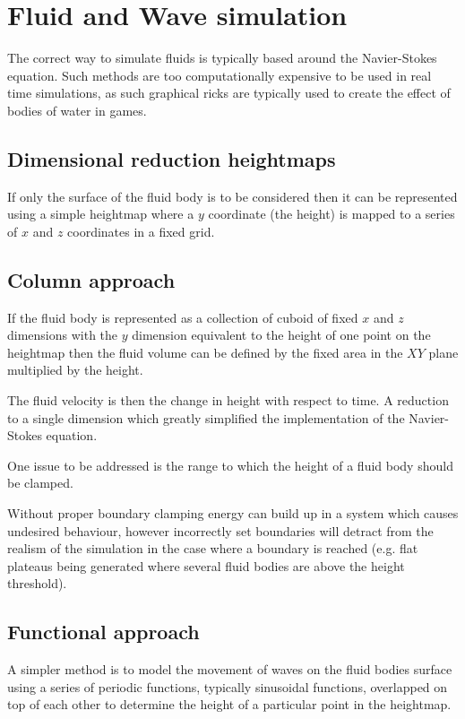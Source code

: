 \documentclass[a4paper]{article}
\begin{document}
\section{Fluid and Wave simulation}
\label{sec:fluid_dynamics}

The correct way to simulate fluids is typically based around the Navier-Stokes
equation. Such methods are too computationally expensive to be used in real time
simulations, as such graphical ricks are typically used to create the effect of
bodies of water in games.

\subsection{Dimensional reduction heightmaps}

If only the surface of the fluid body is to be considered then it can be
represented using a simple heightmap where a $y$ coordinate (the height) is
mapped to a series of $x$ and $z$ coordinates in a fixed grid.

\subsection{Column approach}

If the fluid body is represented as a collection of cuboid of fixed $x$ and $z$
dimensions with the $y$ dimension equivalent to the height of one point on the
heightmap then the fluid volume can be defined by the fixed area in the $XY$
plane multiplied by the height.

The fluid velocity is then the change in height with respect to time. A
reduction to a single dimension which greatly simplified the implementation of
the Navier-Stokes equation.

One issue to be addressed is the range to which the height of a fluid body
should be clamped.

Without proper boundary clamping energy can build up in a system which causes
undesired behaviour, however incorrectly set boundaries will detract from the
realism of the simulation in the case where a boundary is reached (e.g. flat
plateaus being generated where several fluid bodies are above the height
threshold).

\subsection{Functional approach}

A simpler method is to model the movement of waves on the fluid bodies surface
using a series of periodic functions, typically sinusoidal functions, overlapped
on top of each other to determine the height of a particular point in the
heightmap.
\end{document}
